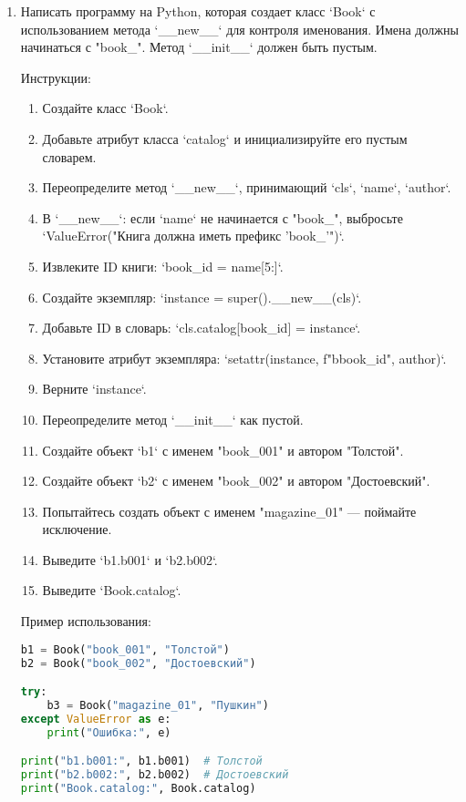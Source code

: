 \begin{enumerate}
\item Написать программу на Python, которая создает класс `Book` с использованием метода `\_\_new\_\_` для контроля именования. Имена должны начинаться с "book\_". Метод `\_\_init\_\_` должен быть пустым.

Инструкции:
\begin{enumerate}
    \item Создайте класс `Book`.
    \item Добавьте атрибут класса `catalog` и инициализируйте его пустым словарем.
    \item Переопределите метод `\_\_new\_\_`, принимающий `cls`, `name`, `author`.
    \item В `\_\_new\_\_`: если `name` не начинается с "book\_", выбросьте `ValueError("Книга должна иметь префикс 'book\_'")`.
    \item Извлеките ID книги: `book\_id = name[5:]`.
    \item Создайте экземпляр: `instance = super().\_\_new\_\_(cls)`.
    \item Добавьте ID в словарь: `cls.catalog[book\_id] = instance`.
    \item Установите атрибут экземпляра: `setattr(instance, f"b{book\_id}", author)`.
    \item Верните `instance`.
    \item Переопределите метод `\_\_init\_\_` как пустой.
    \item Создайте объект `b1` с именем "book\_001" и автором "Толстой".
    \item Создайте объект `b2` с именем "book\_002" и автором "Достоевский".
    \item Попытайтесь создать объект с именем "magazine\_01" — поймайте исключение.
    \item Выведите `b1.b001` и `b2.b002`.
    \item Выведите `Book.catalog`.
\end{enumerate}

Пример использования:
\begin{lstlisting}[language=Python]
b1 = Book("book_001", "Толстой")
b2 = Book("book_002", "Достоевский")

try:
    b3 = Book("magazine_01", "Пушкин")
except ValueError as e:
    print("Ошибка:", e)

print("b1.b001:", b1.b001)  # Толстой
print("b2.b002:", b2.b002)  # Достоевский
print("Book.catalog:", Book.catalog)
\end{lstlisting}


\end{enumerate}
